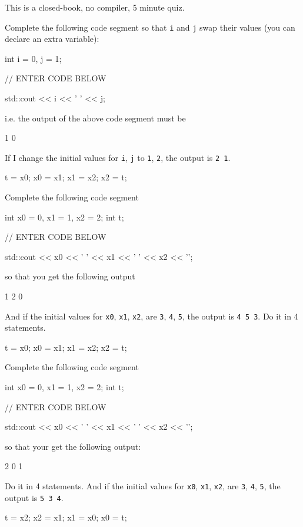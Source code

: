 

This is a closed-book, no compiler, 5 minute quiz.

\nextq
Complete the following code segment so that
\verb!i! and \verb!j!
swap their values (you can declare an extra variable):
\begin{console}[fontsize=\footnotesize]
int i = 0, j = 1;

// ENTER CODE BELOW

std::cout << i << ' ' << j;
\end{console}
i.e. the output of the above code segment must be
\begin{console}[fontsize=\footnotesize]
1 0
\end{console}
If I change the initial values for \verb!i!, \verb!j! to \verb!1!, \verb!2!,
the output is \verb!2 1!.
\\
\ANSWER
\begin{answercode}
t = x0;   
x0 = x1; 
x1 = x2; 
x2 = t;   
\end{answercode}

\nextq
Complete the following code segment
\begin{console}[fontsize=\footnotesize]
int x0 = 0, x1 = 1, x2 = 2;
int t;

// ENTER CODE BELOW

std::cout << x0 << ' ' << x1 << ' ' << x2 << '\n';
\end{console}
so that you get the following output
\begin{console}[fontsize=\footnotesize]
1 2 0
\end{console}
And if the initial values for
\verb!x0!,
\verb!x1!,
\verb!x2!,
are
\verb!3!,
\verb!4!,
\verb!5!,
the output is \verb!4 5 3!.
Do it in 4 statements.
\\
\ANSWER
\begin{answercode}
t = x0; 
x0 = x1; 
x1 = x2;  
x2 = t;  
\end{answercode}

\nextq
Complete the following code segment
\begin{console}[fontsize=\footnotesize]
int x0 = 0, x1 = 1, x2 = 2;
int t;

// ENTER CODE BELOW

std::cout << x0 << ' ' << x1 << ' ' << x2 << '\n';
\end{console}
so that your get the following output:
\begin{console}[fontsize=\footnotesize]
2 0 1
\end{console}
Do it in 4 statements.
And if the initial values for
\verb!x0!,
\verb!x1!,
\verb!x2!,
are
\verb!3!, \verb!4!, \verb!5!,
the output is
\texttt{5\ 3\ 4}.
\\
\ANSWER
\begin{answercode}
t = x2;
x2 = x1;
x1 = x0; 
x0 = t;  
\end{answercode}


